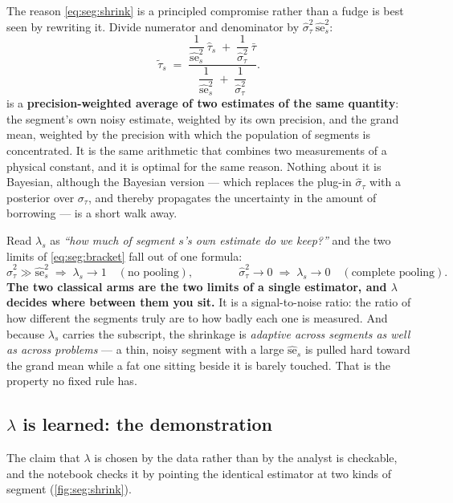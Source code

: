 The reason \cref{eq:seg:shrink} is a principled compromise rather than a fudge is best seen by
rewriting it. Divide numerator and denominator by $\hat\sigma^2_\tau\,\hat{\mathrm{se}}_s^2$:
%
\begin{equation}
  \tilde\tau_s \;=\;
    \frac{\dfrac{1}{\hat{\mathrm{se}}_s^{2}}\ \hat\tau_s \;+\;
          \dfrac{1}{\hat\sigma^{2}_\tau}\ \bar\tau}
         {\dfrac{1}{\hat{\mathrm{se}}_s^{2}} \;+\; \dfrac{1}{\hat\sigma^{2}_\tau}} .
  \label{eq:seg:precision}
\end{equation}
%
 is a \textbf{precision-weighted average of two estimates of the same
quantity}: the segment's own noisy estimate, weighted by its own precision, and the grand mean,
weighted by the precision with which the population of segments is concentrated. It is the same
arithmetic that combines two measurements of a physical constant, and it is optimal for the same
reason. Nothing about it is Bayesian, although the Bayesian version --- which replaces the plug-in
$\hat\sigma_\tau$ with a posterior over $\sigma_\tau$, and thereby propagates the uncertainty in the
amount of borrowing --- is a short walk away.

Read $\lambda_s$ as \emph{``how much of segment $s$'s own estimate do we keep?''} and the two limits
of \cref{eq:seg:bracket} fall out of one formula:
%
\begin{equation}
  \hat\sigma^2_\tau \gg \hat{\mathrm{se}}_s^2 \;\Longrightarrow\; \lambda_s \to 1
     \quad (\text{no pooling}),
  \qquad\qquad
  \hat\sigma^2_\tau \to 0 \;\Longrightarrow\; \lambda_s \to 0
     \quad (\text{complete pooling}).
  \label{eq:seg:limits}
\end{equation}
%
\textbf{The two classical arms are the two limits of a single estimator, and $\lambda$ decides where
between them you sit.} It is a signal-to-noise ratio: the ratio of how different the segments truly
are to how badly each one is measured. And because $\lambda_s$ carries the subscript, the shrinkage
is \emph{adaptive across segments as well as across problems} --- a thin, noisy segment with a large
$\hat{\mathrm{se}}_s$ is pulled hard toward the grand mean while a fat one sitting beside it is
barely touched. That is the property no fixed rule has.

\subsection*{$\lambda$ is learned: the demonstration}

The claim that $\lambda$ is chosen by the data rather than by the analyst is checkable, and the
notebook checks it by pointing the identical estimator at two kinds of segment
(\cref{fig:seg:shrink}).

